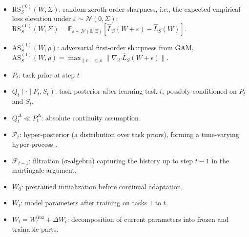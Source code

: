 \documentclass{article}
\begin{document}
\begin{itemize}
\item $\mathrm{RS}_S^{(0)}(W,\Sigma)$: random zeroth-order sharpness, i.e., the expected empirical loss elevation under $\varepsilon\sim\mathcal N(0,\Sigma)$:
$\mathrm{RS}_S^{(0)}(W,\Sigma)=\mathbb E_{\varepsilon\sim\mathcal N(0,\Sigma)}[\hat L_S(W+\varepsilon)-\hat L_S(W)]$.
\item $\mathrm{AS}^{(1)}_S(W,\rho)$: adversarial first-order sharpness  from GAM,
$\mathrm{AS}^{(1)}_S(W,\rho)=\max_{\|\epsilon\|\le\rho}\|\nabla_W\widehat L_S(W+\epsilon)\|$.


\item $P_t$: task prior at step $t$ 
\item $Q_t(\cdot \mid P_t,S_t)$: task posterior after learning task $t$, possibly conditioned on $P_t$ and $S_t$.
\item $Q_t^\Delta \ll P_t^\Delta$: absolute continuity assumption
\item $\mathcal P_t$: hyper-posterior (a distribution over task priors), forming a time-varying hyper-process . 
\item $\mathcal F_{t-1}$: filtration ($\sigma$-algebra) capturing the history up to step $t-1$ in the martingale argument.

\item $W_0$: pretrained initialization before continual adaptation.
\item $W_t$: model parameters after training on tasks $1$ to $t$.
\item $W_t = W_t^{\mathrm{froz}} + \Delta W_t$: decomposition of current parameters into frozen and trainable parts. 






\end{itemize}
\end{document}
